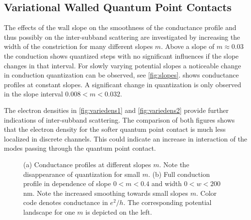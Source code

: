 \subsection{Variational Walled Quantum Point Contacts}
The effects of  the wall slope on the smoothness of the conductance profile and thus possibly on the inter-subband scattering are investigated by increasing the width of the constriction for many different slopes $m$. Above a slope of $m \approx 0.03$ the conduction shows quantized steps with no significant influences if the slope changes in that interval. For slowly varying potential slopes a noticeable change in conduction quantization can be observed, see \cref{fig:slopes}.  shows conductance profiles at constant slopes. A significant change in quantization is only observed in the slope interval $0.008 < m < 0.032$.\par
The electron densities in \cref{fig:variedens1} and \cref{fig:variedens2} provide further indications of inter-subband scattering. The comparison of both figures shows that the electron density for the softer quantum point contact is much less localized in discrete channels. This could indicate an increase in interaction of the modes passing through the quantum point contact.\par
\begin{figure}[h] 
\centering
{}
\caption{(a) Conductance profiles at different slopes $m$. Note the disappearance of quantization for small $m$. (b) Full conduction profile in dependence of slope $0 < m < 0.4$ and width $0 < w < 200$ nm. Note the increased smoothing towards small slopes $m$. Color code denotes conductance in $e^2/h$. The corresponding potential landscape for one $m$ is depicted on the left.}\label{fig:conductances}
\end{figure}
